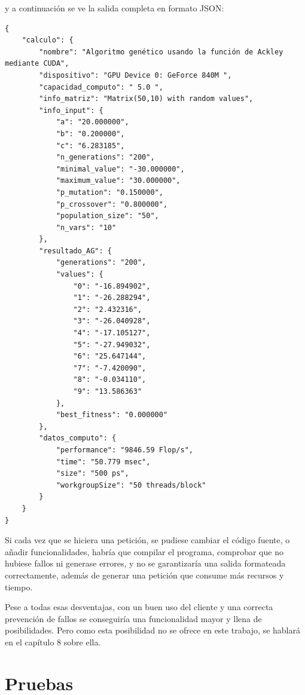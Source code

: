 \bigskip
y a continuación se ve la salida completa en formato JSON:

\begin{lstlisting}
{
	"calculo": {
		"nombre": "Algoritmo genético usando la función de Ackley mediante CUDA",
		"dispositivo": "GPU Device 0: GeForce 840M ",
		"capacidad_computo": " 5.0 ",
		"info_matriz": "Matrix(50,10) with random values",
		"info_input": {
			"a": "20.000000",
			"b": "0.200000",
			"c": "6.283185",
			"n_generations": "200",
			"minimal_value": "-30.000000",
			"maximum_value": "30.000000",
			"p_mutation": "0.150000",
			"p_crossover": "0.800000",
			"population_size": "50",
			"n_vars": "10"
		},
		"resultado_AG": {
			"generations": "200",
			"values": {
				"0": "-16.894902",
				"1": "-26.288294",
				"2": "2.432316",
				"3": "-26.040928",
				"4": "-17.105127",
				"5": "-27.949032",
				"6": "25.647144",
				"7": "-7.420090",
				"8": "-0.034110",
				"9": "13.586363"
			},
			"best_fitness": "0.000000"
		},
		"datos_computo": {
			"performance": "9846.59 Flop/s",
			"time": "50.779 msec",
			"size": "500 ps",
			"workgroupSize": "50 threads/block"
		}
	}
}
\end{lstlisting}


\bigskip
Si cada vez que se hiciera una petición, se pudiese cambiar el código fuente, o añadir funcionalidades, habría que compilar el programa, comprobar que no hubiese fallos ni generase errores, y no se garantizaría una salida formateada correctamente, además de generar una petición que consume más recursos y tiempo.

\bigskip
Pese a todas esas desventajas, con un buen uso del cliente y una correcta prevención de fallos se conseguiría una funcionalidad mayor y llena de posibilidades. Pero como esta posibilidad no se ofrece en este trabajo, se hablará en el capítulo 8 sobre ella.


\newpage
\section{Pruebas}




